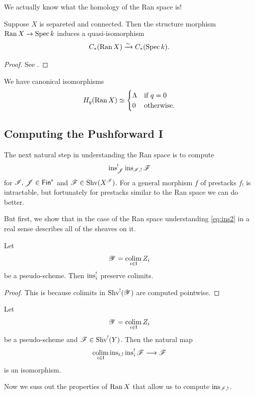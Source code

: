 \documentclass[oneside]{amsart}
\begin{document}
We actually know what the homology of the Ran space is!
\begin{theorem}
	Suppose $X$ is separeted and connected. Then the structure morphism $\Ran X\to \Spec k$ induces a quasi-isomorphism
	\[
	C_*(\operatorname{Ran} X) \xrightarrow{\sim} C_*(\operatorname{Spec} k).
	\] 
\end{theorem}
\begin{proof}
	See \cite[Theorem~2.4.5]{weil}.
\end{proof}
\begin{corollary}
	We have canonical isomorphisms
	\[
	H_q(\operatorname{Ran} X) \simeq \begin{cases}
		\Lambda & \text{if }q=0 \\
		0 & \text{otherwise}.
	\end{cases}
	\] 
\end{corollary}

\subsection{Computing the Pushforward I}
The next natural step in understanding the Ran space is to compute
\begin{equation}\label{eq:ins2}
\operatorname{ins}_{\mathscr{J}}^{!}\operatorname{ins}_{\mathscr{I},!} \mathscr{F}
\end{equation} 
for $\CI,\CJ\in \Fins$ and $\mathscr{F}\in \operatorname{Shv}(X^{\mathscr{I}})$. For a general morphism $f$ of prestacks $f_!$ is intractable, but fortunately for prestacks similar to the Ran space we can do better.

But first, we show that in the case of the Ran space understanding \eqref{eq:ins2} in a real sense describes all of the sheaves on it.

\begin{lemma}
	Let
	\[
		\mathscr{Y} = \operatorname*{colim}_{i\in \mathsf{I}}Z_i
	\] 
	be a pseudo-scheme. Then $\operatorname{ins}_i^{!}$ preserve colimits.
\end{lemma}
\begin{proof}
	This is because colimits in $\operatorname{Shv}^{!}(\mathscr{Y})$ are computed pointwise.
\end{proof}
\begin{corollary}
	Let
	\[
		\mathscr{Y} = \operatorname*{colim}_{i\in \mathsf{I}}Z_i
	\] 
	be a pseudo-scheme and $\mathscr{F}\in \operatorname{Shv}^{!}(Y)$. Then the natural map
	\[
		\colim_{i\in \cat{I}} \ins_{i,!}\ins_i^{!}\CF \to \CF
	\] 
	is an isomorphism.
\end{corollary}

Now we suss out the properties of $\operatorname{Ran} X$ that allow us to compute $\operatorname{ins}_{\mathscr{I},!}$.
\end{document}
